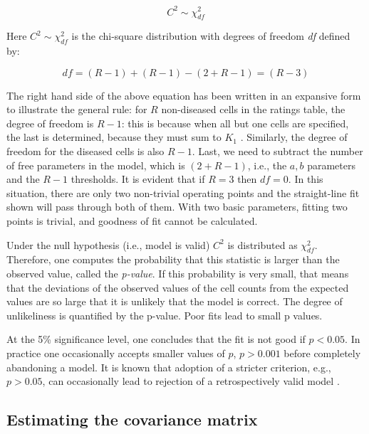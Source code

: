 \documentclass[
]{book}
\begin{document}
\begin{equation} 
C^2\sim \chi_{df}^{2}
\label{eq:binormal-modelGoodnessFitDistr}
\end{equation}

Here \(C^2\sim \chi_{df}^{2}\) is the chi-square distribution with degrees of freedom \emph{df} defined by:

\begin{equation} 
df=\left ( R-1 \right )+\left ( R-1 \right )-\left (2+ R-1 \right )=\left ( R-3 \right )
\label{eq:binormal-modelGoodnessFitdf}
\end{equation}

The right hand side of the above equation has been written in an expansive form to illustrate the general rule: for \(R\) non-diseased cells in the ratings table, the degree of freedom is \(R-1\): this is because when all but one cells are specified, the last is determined, because they must sum to \(K_1\) . Similarly, the degree of freedom for the diseased cells is also \(R-1\). Last, we need to subtract the number of free parameters in the model, which is \((2+R-1)\), i.e., the \(a,b\) parameters and the \(R-1\) thresholds. It is evident that if \(R = 3\) then \(df = 0\). In this situation, there are only two non-trivial operating points and the straight-line fit shown will pass through both of them. With two basic parameters, fitting two points is trivial, and goodness of fit cannot be calculated.

Under the null hypothesis (i.e., model is valid) \(C^2\) is distributed as \(\chi_{df}^{2}\). Therefore, one computes the probability that this statistic is larger than the observed value, called the \emph{p-value}. If this probability is very small, that means that the deviations of the observed values of the cell counts from the expected values are so large that it is unlikely that the model is correct. The degree of unlikeliness is quantified by the p-value. Poor fits lead to small p values.

At the 5\% significance level, one concludes that the fit is not good if \(p < 0.05\). In practice one occasionally accepts smaller values of \(p\), \(p > 0.001\) before completely abandoning a model. It is known that adoption of a stricter criterion, e.g., \(p > 0.05\), can occasionally lead to rejection of a retrospectively valid model \citep{RN300}.

\hypertarget{estimating-the-covariance-matrix}{%
\subsection{Estimating the covariance matrix}\label{estimating-the-covariance-matrix}}
\end{document}
